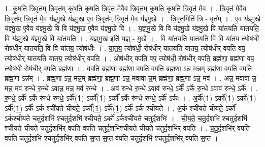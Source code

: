 \documentclass[17pt]{extarticle}
\begin{document}
1. कृ॒ष॒ति॒ त्रि॒वृत॑म् त्रि॒वृत॑म् कृषति कृषति त्रि॒वृत॑ मे॒वैव त्रि॒वृत॑म् कृषति कृषति त्रि॒वृत॑ मे॒व । . त्रि॒वृत॑ मे॒वैव त्रि॒वृत॑म् त्रि॒वृत॑ मे॒व य॑ज्ञ्मु॒खे य॑ज्ञ्मु॒ख ए॒व त्रि॒वृत॑म् त्रि॒वृत॑ मे॒व य॑ज्ञ्मु॒खे । . त्रि॒वृत॒मिति॑ त्रि - वृत᳚म् । . ए॒व य॑ज्ञ्मु॒खे य॑ज्ञ्मु॒ख ए॒वैव य॑ज्ञ्मु॒खे वि वि य॑ज्ञ्मु॒ख ए॒वैव य॑ज्ञ्मु॒खे वि । . य॒ज्ञ्॒मु॒खे वि वि य॑ज्ञ्मु॒खे य॑ज्ञ्मु॒खे वि या॑तयति यातयति॒ वि य॑ज्ञ्मु॒खे य॑ज्ञ्मु॒खे वि या॑तयति । . य॒ज्ञ्॒मु॒ख इति॑ यज्ञ् - मु॒खे । . वि या॑तयति यातयति॒ वि वि या॑तय॒ त्योष॑धी॒ रोष॑धीर् यातयति॒ वि वि या॑तय॒ त्योष॑धीः । . या॒त॒य॒ त्योष॑धी॒ रोष॑धीर् यातयति यातय॒ त्योष॑धीर् वपति वप॒ त्योष॑धीर् यातयति यातय॒ त्योष॑धीर् वपति । . ओष॑धीर् वपति वप॒ त्योष॑धी॒ रोष॑धीर् वपति॒ ब्रह्म॑णा॒ ब्रह्म॑णा वप॒ त्योष॑धी॒ रोष॑धीर् वपति॒ ब्रह्म॑णा । . व॒प॒ति॒ ब्रह्म॑णा॒ ब्रह्म॑णा वपति वपति॒ ब्रह्म॒णा ऽन्न॒ मन्न॒म् ब्रह्म॑णा वपति वपति॒ ब्रह्म॒णा ऽन्न᳚म् । . ब्रह्म॒णा ऽन्न॒ मन्न॒म् ब्रह्म॑णा॒ ब्रह्म॒णा ऽन्न॒ मवावा न्न॒म् ब्रह्म॑णा॒ ब्रह्म॒णा ऽन्न॒ मव॑ । . अन्न॒ मवावा न्न॒ मन्न॒ मव॑ रुन्धे रु॒न्धे ऽवान्न॒ मन्न॒ मव॑ रुन्धे । . अव॑ रुन्धे रु॒न्धे ऽवाव॑ रुन्धे॒ ऽर्के᳚ ऽर्के रु॒न्धे ऽवाव॑ रुन्धे॒ ऽर्के । . रु॒न्धे॒ ऽर्के᳚ ऽर्के रु॑न्धे रुन्धे॒ ऽर्के᳚(1॒) ऽर्को᳚(1॒) ऽर्को᳚ ऽर्के रु॑न्धे रुन्धे॒ ऽर्के᳚ ऽर्कः । . अ॒र्के᳚(1॒) ऽर्को᳚(1॒) ऽर्को᳚(1॒) ऽर्के᳚(1॒) ऽर्के᳚ ऽर्क श्ची॑यते चीयते॒ ऽर्को᳚(1॒) ऽर्के᳚(1॒) ऽर्के᳚ ऽर्क श्ची॑यते । . अ॒र्क श्ची॑यते चीयते॒ ऽर्को᳚ ऽर्कश्ची॑यते चतुर्द॒शभि॑ श्चतुर्द॒शभि॑ श्चीयते॒ ऽर्को᳚ ऽर्कश्ची॑यते चतुर्द॒शभिः॑ । . ची॒य॒ते॒ च॒तु॒र्द॒शभि॑ श्चतुर्द॒शभि॑ श्चीयते चीयते चतुर्द॒शभि॑र् वपति वपति चतुर्द॒शभि॑श्चीयते चीयते चतुर्द॒शभि॑र् वपति । . च॒तु॒र्द॒शभि॑र् वपति वपति चतुर्द॒शभि॑ श्चतुर्द॒शभि॑र् वपति स॒प्त स॒प्त व॑पति चतुर्द॒शभि॑ श्चतुर्द॒शभि॑र् वपति स॒प्त । \newline
\end{document}

